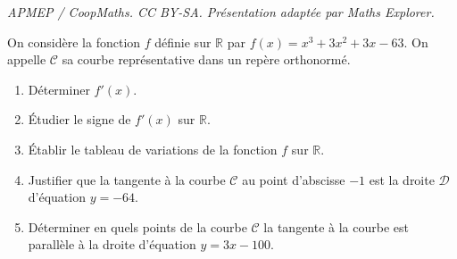 \documentclass[10pt]{article}
\providecommand{\R}{\mathbb{R}}
\begin{document}
\noindent\textit{APMEP / CoopMaths. CC BY-SA. Présentation adaptée par Maths Explorer.}\par\medskip
\medskip

On considère la fonction $f$ définie sur $\R$ par $f(x) = x^3 + 3x^2 + 3x -63$.
On appelle $\mathcal{C}$ sa courbe représentative dans un repère orthonormé.

\medskip

\begin{enumerate}
\item Déterminer $f'(x)$.
\item Étudier le signe de $f'(x)$ sur $\R$.
\item Établir le tableau de variations de la fonction $f$ sur $\R$.
\item Justifier que la tangente à la courbe $\mathcal{C}$ au point d'abscisse $-1$ est la droite $\mathcal{D}$ d'équation
$y= -64$.
\item Déterminer en quels points de la courbe $\mathcal{C}$ la tangente à la courbe est parallèle à la droite
d'équation $y = 3x - 100$.
\end{enumerate}

\vspace{0,5cm}
\end{document}

